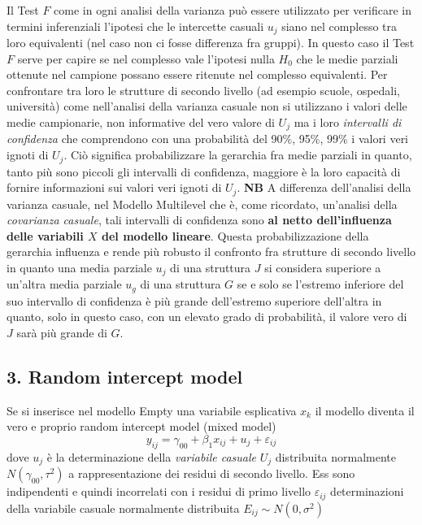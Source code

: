 \documentclass[a4page, 11pt]{article} %
\begin{document}
Il Test $F$ come in ogni analisi della varianza può essere utilizzato per verificare in termini inferenziali l’ipotesi che le intercette casuali $u_j$ siano nel complesso tra loro equivalenti (nel caso non ci fosse differenza fra gruppi). In questo caso il Test $F$ serve per capire se nel complesso vale l’ipotesi nulla $H_0$ che le medie parziali ottenute nel campione possano essere ritenute nel complesso equivalenti. Per confrontare tra loro le strutture di secondo livello (ad esempio scuole, ospedali, università) come nell’analisi della varianza casuale non si utilizzano i valori delle medie campionarie, non informative del vero valore di $U_j$ ma i loro \textit{intervalli di confidenza} che comprendono con una probabilità del 90\%, 95\%, 99\% i valori veri ignoti di $U_j$.
Ciò significa probabilizzare la gerarchia fra medie parziali in quanto, tanto più sono piccoli gli intervalli di confidenza, maggiore è la loro capacità di fornire informazioni sui valori veri ignoti di $U_j$. 
\newline
\newline
\textbf{NB} A differenza dell’analisi della varianza casuale, nel Modello Multilevel che è, come ricordato, un’analisi della \textit{covarianza casuale}, tali intervalli di confidenza sono \textbf{al netto dell’influenza delle variabili $X$ del modello lineare}. Questa probabilizzazione della gerarchia influenza e rende più robusto il confronto fra strutture di secondo livello in quanto una media parziale $u_j$ di una struttura $J$ si considera superiore a un’altra media parziale $u_g$ di una struttura $G$ se e solo se l’estremo inferiore del suo intervallo di confidenza è più grande dell’estremo superiore dell’altra in quanto, solo in questo caso, con un elevato grado di probabilità, il valore vero di $J$ sarà più grande di $G$.

\subsection*{3. Random intercept model}
Se si inserisce nel modello Empty una variabile esplicativa $x_k$ il modello diventa il vero e proprio random intercept model (mixed model) 
\begin{equation*}
y_{ij}=\gamma_{00}+\beta_1 x_{ij}+ u_j + \varepsilon_{ij} 
\end{equation*}
dove $u_j$ è la determinazione della \textit{variabile casuale} $U_j$ distribuita normalmente $N(\gamma_{00}, \tau^2)$ a rappresentazione dei residui di secondo livello. Ess sono indipendenti e quindi incorrelati con i residui di primo livello $\varepsilon_{ij}$ determinazioni della variabile casuale normalmente distribuita $E_{ij} \sim N(0,\sigma^2)$
\end{document}
